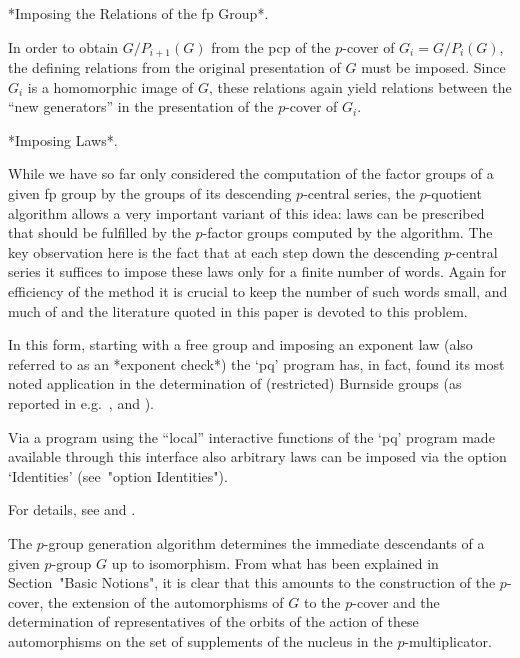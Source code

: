 *Imposing the Relations of the fp Group*.

In order to obtain $G/P_{i+1}(G)$ from the pcp  of  the  $p$-cover  of
$G_i  =  G/P_i(G)$,  the  defining   relations   from   the   original
presentation of $G$ must be imposed.  Since  $G_i$  is  a  homomorphic
image of $G$, these relations again yield relations between the  ``new
generators'' in the presentation of the $p$-cover of $G_i$.

*Imposing Laws*. 

While we have so far only considered the  computation  of  the  factor
groups of a given fp group by the groups of its descending $p$-central
series, the $p$-quotient algorithm allows a very important variant  of
this idea: laws can be prescribed that  should  be  fulfilled  by  the
$p$-factor groups computed by the algorithm. The key observation  here
is the fact that at each step down the descending  $p$-central  series
it suffices to impose these laws only for a finite  number  of  words.
Again for efficiency of the method it is crucial to keep the number of
such words small, and much of \cite{NO96} and the literature quoted in
this paper is devoted to this problem.

In this form, starting with a free group and imposing an exponent  law
(also referred to as an *exponent check*) the  `pq'  program  has,  in
fact, found  its  most  noted  application  in  the  determination  of
(restricted)  Burnside  groups  (as  reported   in   e.g.~\cite{HN80},
\cite{NO96} and \cite{VL90b}).

Via a {\GAP} program using the ``local'' interactive functions of  the
`pq' program made available through this interface also arbitrary laws
can be imposed via the option `Identities' (see~"option Identities").


For details, see \cite{New77} and \cite{OBr90}.

The  $p$-group   generation   algorithm   determines   the   immediate
descendants of a given $p$-group $G$ up to isomorphism. From what  has
been explained in Section~"Basic  Notions",  it  is  clear  that  this
amounts to the construction of the $p$-cover,  the  extension  of  the
automorphisms of  $G$  to  the  $p$-cover  and  the  determination  of
representatives of the orbits of the action of these automorphisms  on
the set of supplements of the nucleus in the $p$-multiplicator.

